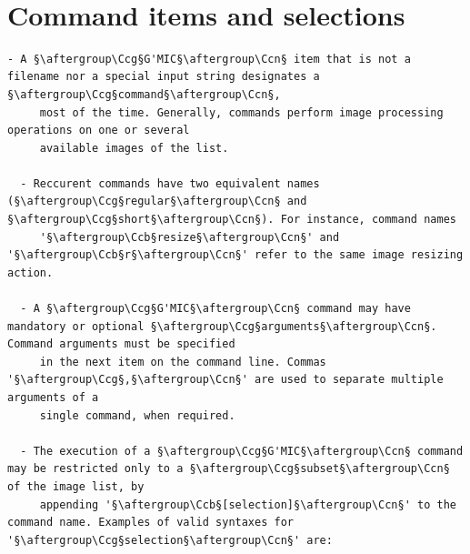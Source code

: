 \documentclass[a4paper,10.5pt,twoside]{book}
\def\Ccb{\color{cb}}
\def\Ccg{\color{cc}}
\def\Ccn{\color{black}}
\begin{document}
\normalsize
~\\\section{Command items and selections}
\small
\begin{lstlisting}[escapechar=§]
  - A §\aftergroup\Ccg§G'MIC§\aftergroup\Ccn§ item that is not a filename nor a special input string designates a §\aftergroup\Ccg§command§\aftergroup\Ccn§, 
     most of the time. Generally, commands perform image processing operations on one or several 
     available images of the list. 
 
  - Reccurent commands have two equivalent names (§\aftergroup\Ccg§regular§\aftergroup\Ccn§ and §\aftergroup\Ccg§short§\aftergroup\Ccn§). For instance, command names 
     '§\aftergroup\Ccb§resize§\aftergroup\Ccn§' and '§\aftergroup\Ccb§r§\aftergroup\Ccn§' refer to the same image resizing action. 
 
  - A §\aftergroup\Ccg§G'MIC§\aftergroup\Ccn§ command may have mandatory or optional §\aftergroup\Ccg§arguments§\aftergroup\Ccn§. Command arguments must be specified 
     in the next item on the command line. Commas '§\aftergroup\Ccg§,§\aftergroup\Ccn§' are used to separate multiple arguments of a 
     single command, when required. 
 
  - The execution of a §\aftergroup\Ccg§G'MIC§\aftergroup\Ccn§ command may be restricted only to a §\aftergroup\Ccg§subset§\aftergroup\Ccn§ of the image list, by 
     appending '§\aftergroup\Ccb§[selection]§\aftergroup\Ccn§' to the command name. Examples of valid syntaxes for '§\aftergroup\Ccg§selection§\aftergroup\Ccn§' are: 
 

\end{lstlisting}
\end{document}
